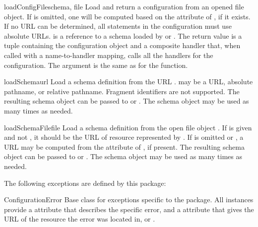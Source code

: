 \documentclass{howto}
\begin{document}
\begin{funcdesc}{loadConfigFile}{schema, file}
  Load and return a configuration from an opened file object.  If
   is omitted, one will be computed based on the
   attribute of , if it exists.  If no URL can
  be determined, all  statements in the
  configuration must use absolute URLs.   is a reference
  to a schema loaded by  or
  .
  The return value is a tuple containing the configuration object and
  a composite handler that, when called with a name-to-handler
  mapping, calls all the handlers for the configuration.
  The  argument is the same as for the
   function.
\end{funcdesc}

\begin{funcdesc}{loadSchema}{url}
  Load a schema definition from the URL .
   may be a URL, absolute pathname, or relative pathname.
  Fragment identifiers are not supported.
  The resulting
  schema object can be passed to  or
  .  The schema object may be used as many
  times as needed.
\end{funcdesc}

\begin{funcdesc}{loadSchemaFile}{file}
  Load a schema definition from the open file object .  If
   is given and not , it should be the URL of
  resource represented by .  If  is omitted or
  , a URL may be computed from the  attribute
  of , if present.  The resulting schema object can
  be passed to  or .
  The schema object may be used as many times as needed.
\end{funcdesc}

The following exceptions are defined by this package:

\begin{excdesc}{ConfigurationError}
  Base class for exceptions specific to the  package.
  All instances provide a  attribute that describes
  the specific error, and a  attribute that gives the URL
  of the resource the error was located in, or .
\end{excdesc}
\end{document}
